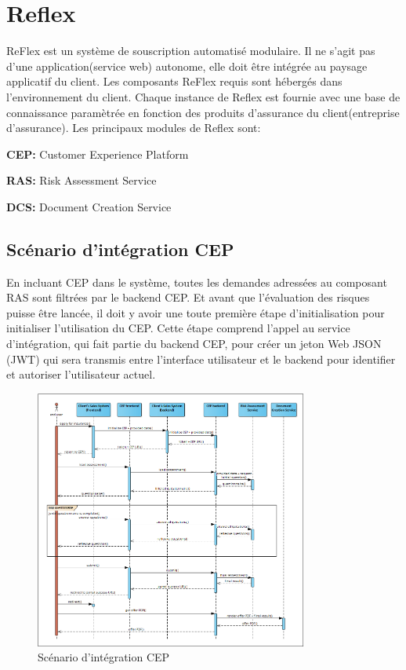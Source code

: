 \section{Reflex}
ReFlex est un système de souscription automatisé modulaire. Il ne s'agit pas d'une application(service web) autonome, elle doit  être intégrée au paysage applicatif du client. Les composants ReFlex requis sont hébergés dans l'environnement du client. Chaque instance de Reflex est fournie avec une base de connaissance paramètrée en fonction des produits d'assurance du client(entreprise d'assurance).
Les principaux modules de Reflex sont:
\begin{list}{•}
\item \textbf{CEP:} Customer Experience Platform
\item
\item \textbf{RAS:} Risk Assessment Service
\item \textbf{DCS:} Document Creation Service 
\end{list}
\subsection{Scénario d'intégration CEP}
En incluant CEP dans le système, toutes les demandes adressées au composant RAS sont filtrées par le backend CEP. Et avant que l'évaluation des risques puisse être lancée, il doit y avoir une toute première étape d'initialisation pour initialiser l'utilisation du CEP. Cette étape comprend l'appel au service d'intégration, qui fait partie du backend CEP, pour créer un jeton Web JSON (JWT) qui sera transmis entre l'interface utilisateur et le backend pour identifier et autoriser l'utilisateur actuel.
 \begin{figure}[!th]
            \centering
                \includegraphics[width=0.8\textwidth]{Figures/cepreflex}
	       \decoRule
		\caption[Scénario d'intégration CEP]{Scénario d'intégration CEP}
\label{fig:Cep}
\end{figure}
